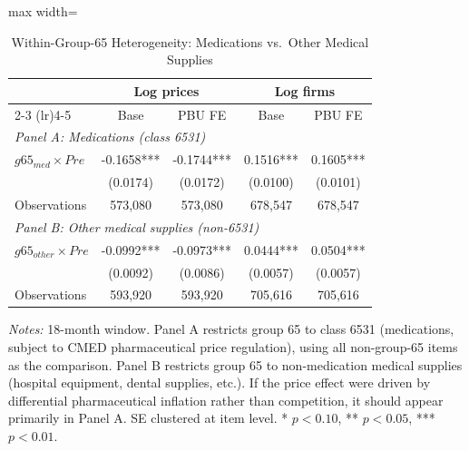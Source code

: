 \begin{table}[htbp]
\centering
\caption{Within-Group-65 Heterogeneity: Medications vs.\ Other Medical Supplies}
\label{tab:within_g65}
\begin{adjustbox}{max width=\textwidth}
\begin{threeparttable}
\small
\begin{tabular}{lcccc}
\toprule
 & \multicolumn{2}{c}{Log prices} & \multicolumn{2}{c}{Log firms} \\
\cmidrule(lr){2-3} \cmidrule(lr){4-5}
 & Base & PBU FE & Base & PBU FE \\
\midrule
\multicolumn{5}{l}{\textit{Panel A: Medications (class 6531)}} \\
$g65_{med} \times Pre$ & -0.1658*** & -0.1744*** & 0.1516*** & 0.1605*** \\
 & (0.0174) & (0.0172) & (0.0100) & (0.0101) \\
Observations & 573,080 & 573,080 & 678,547 & 678,547 \\
\midrule
\multicolumn{5}{l}{\textit{Panel B: Other medical supplies (non-6531)}} \\
$g65_{other} \times Pre$ & -0.0992*** & -0.0973*** & 0.0444*** & 0.0504*** \\
 & (0.0092) & (0.0086) & (0.0057) & (0.0057) \\
Observations & 593,920 & 593,920 & 705,616 & 705,616 \\
\bottomrule
\end{tabular}
\begin{tablenotes}
\small
\item \textit{Notes:} 18-month window. Panel A restricts group 65 to class 6531 
(medications, subject to CMED pharmaceutical price regulation), using all non-group-65 items 
as the comparison. Panel B restricts group 65 to non-medication medical supplies 
(hospital equipment, dental supplies, etc.). If the price effect were driven by 
differential pharmaceutical inflation rather than competition, it should appear 
primarily in Panel A. SE clustered at item level. 
* $p<0.10$, ** $p<0.05$, *** $p<0.01$.
\end{tablenotes}
\end{threeparttable}
\end{adjustbox}
\end{table}
